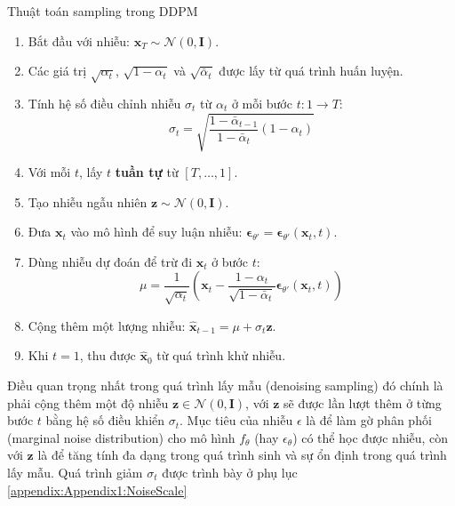 

\begin{algorithm}[H]
	\caption{Thuật toán sampling trong DDPM}
	\label{alg:samplingddpm}
	\setlength{\baselineskip}{10pt}
	\begin{enumerate}
		\item Bắt đầu với nhiễu: $\mathbf{x}_T \sim \mathcal{N}(0, \mathbf{I})$.
		
		\item Các giá trị $\sqrt{\alpha_t}$, $\sqrt{1 - \alpha_t}$ và $\sqrt{\bar{\alpha}_t}$ được lấy từ quá trình huấn luyện.
		
		\item Tính hệ số điều chỉnh nhiễu $\sigma_t$ từ $\alpha_t$ ở mỗi bước $t: 1 \rightarrow T$:
		\[
		\sigma_t = \sqrt{\frac{1 - \bar{\alpha}_{t-1}}{1 - \bar{\alpha}_t} (1 - \alpha_t)}
		\]
		
		\item Với mỗi $t$, lấy $t$ \textbf{tuần tự} từ $[T, \dots, 1]$.
		
		\item Tạo nhiễu ngẫu nhiên $\mathbf{z} \sim \mathcal{N}(0, \mathbf{I})$.
		
		\item Đưa $\mathbf{x}_t$ vào mô hình để suy luận nhiễu: $\boldsymbol{\epsilon}_{\theta'} = \boldsymbol{\epsilon}_{\theta'}(\mathbf{x}_t, t)$.
		
		\item Dùng nhiễu dự đoán để trừ đi $\mathbf{x}_t$ ở bước $t$:
		\[
		\mu = \frac{1}{\sqrt{\alpha_t}} \left( \mathbf{x}_t - \frac{1 - \alpha_t}{\sqrt{1 - \bar{\alpha}_t}} \boldsymbol{\epsilon}_{\theta'}(\mathbf{x}_t, t) \right)
		\]
		
		\item Cộng thêm một lượng nhiễu: $\hat{\mathbf{x}}_{t-1} = \mu + \sigma_t \mathbf{z}$.
		
		\item Khi $t = 1$, thu được $\hat{\mathbf{x}}_0$ từ quá trình khử nhiễu.
	\end{enumerate}

\end{algorithm}

Điều quan trọng nhất trong quá trình lấy mẫu (denoising sampling) đó chính là phải cộng thêm một độ nhiễu $\mathbf{z} \in \mathcal{N}(0, \mathbf{I})$, với $\mathbf{z}$  sẽ được lần lượt thêm ở từng bước $t$ bằng hệ số điều khiển $\sigma_t$. Mục tiêu của nhiễu $\epsilon$ là để  làm gờ phân phối (marginal noise distribution) cho mô hình $f_\theta$ (hay $\epsilon_{\theta}$) có thể học được nhiễu, còn với  $\mathbf{z}$ là để tăng tính đa dạng trong quá trình sinh và sự ổn định trong quá trình lấy mẫu. Quá trình giảm $\sigma_t$ được trình bày ở phụ lục \autoref{appendix:Appendix1:NoiseScale}


